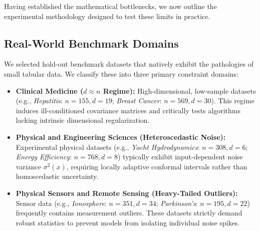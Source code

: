 \documentclass{article}
\begin{document}
Having established the mathematical bottlenecks, we now outline the experimental methodology designed to test these limits in practice.

\subsection{Real-World Benchmark Domains}
We selected hold-out benchmark datasets that natively exhibit the pathologies of small tabular data. We classify these into three primary constraint domains:
\begin{itemize}
    \item \textbf{Clinical Medicine ($d \approx n$ Regime):} High-dimensional, low-sample datasets (e.g., \textit{Hepatitis}: $n=155, d=19$; \textit{Breast Cancer}: $n=569, d=30$). This regime induces ill-conditioned covariance matrices and critically tests algorithms lacking intrinsic dimensional regularization.
    \item \textbf{Physical and Engineering Sciences (Heteroscedastic Noise):} Experimental physical datasets (e.g., \textit{Yacht Hydrodynamics}: $n=308, d=6$; \textit{Energy Efficiency}: $n=768, d=8$) typically exhibit input-dependent noise variance $\sigma^2(x)$, requiring locally adaptive conformal intervals rather than homoscedastic uncertainty.
    \item \textbf{Physical Sensors and Remote Sensing (Heavy-Tailed Outliers):} Sensor data (e.g., \textit{Ionosphere}: $n=351, d=34$; \textit{Parkinson's}: $n=195, d=22$) frequently contains measurement outliers. These datasets strictly demand robust statistics to prevent models from isolating individual noise spikes.
\end{itemize}
\end{document}
